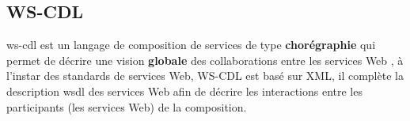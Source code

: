 





    \subsection{WS-CDL}
    \label{WS-CDL}
    \acrshort{ws-cdl} est un langage de composition de services de
    type \textbf{chorégraphie} qui permet de décrire une vision
    \textbf{globale} des collaborations entre les services Web
    \cite{elie2010}, à l'instar des standards de services Web,
    \textsc{WS-CDL} est basé sur \textsc{XML}, il complète la
    description \acrshort{wsdl} des services Web afin de décrire les
    interactions entre les participants (les services Web) de la
    composition.

